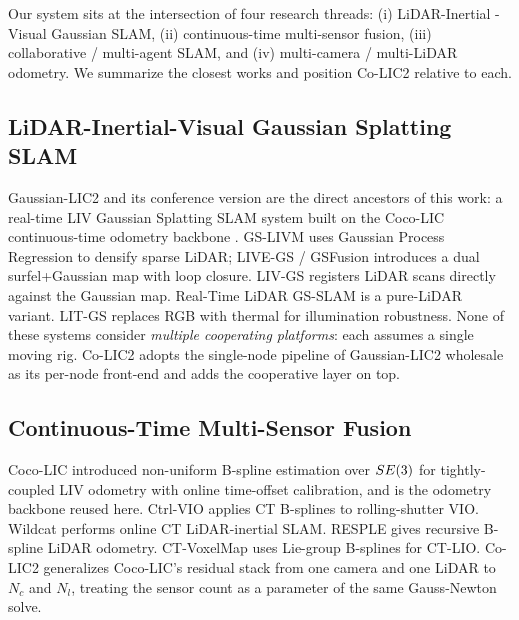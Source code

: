 Our system sits at the intersection of four research threads: (i) LiDAR-Inertial
-Visual Gaussian SLAM, (ii) continuous-time multi-sensor fusion, (iii)
collaborative / multi-agent SLAM, and (iv) multi-camera / multi-LiDAR
odometry. We summarize the closest works and position Co-LIC2 relative to each.

\subsection{LiDAR-Inertial-Visual Gaussian Splatting SLAM}
Gaussian-LIC2 \cite{lang2026gaussian2} and its conference version
\cite{lang2025gaussian} are the direct ancestors of this work: a real-time
LIV Gaussian Splatting SLAM system built on the Coco-LIC continuous-time
odometry backbone \cite{lang2023coco}. GS-LIVM \cite{xie2025gslivm} uses
Gaussian Process Regression to densify sparse LiDAR; LIVE-GS / GSFusion
\cite{park2026livegs} introduces a dual surfel+Gaussian map with loop closure.
LIV-GS \cite{xiao2025livgs} registers LiDAR scans directly against the Gaussian
map. Real-Time LiDAR GS-SLAM \cite{tak2026realtime} is a pure-LiDAR
variant. LIT-GS \cite{shi2026litgs} replaces RGB with thermal for illumination
robustness. None of these systems consider \emph{multiple cooperating
platforms}: each assumes a single moving rig. Co-LIC2 adopts the single-node
pipeline of Gaussian-LIC2 wholesale as its per-node front-end and adds the
cooperative layer on top.

\subsection{Continuous-Time Multi-Sensor Fusion}
Coco-LIC \cite{lang2023coco} introduced non-uniform B-spline estimation over
$SE(3)$ for tightly-coupled LIV odometry with online time-offset
calibration, and is the odometry backbone reused here. Ctrl-VIO
\cite{lang2022ctrlvio} applies CT B-splines to rolling-shutter VIO. Wildcat
\cite{ramezani2022wildcat} performs online CT LiDAR-inertial SLAM. RESPLE
\cite{cao2025resple} gives recursive B-spline LiDAR odometry. CT-VoxelMap
\cite{zhao2026ctvoxelmap} uses Lie-group B-splines for CT-LIO. Co-LIC2
generalizes Coco-LIC's residual stack from one camera and one LiDAR to $N_c$
and $N_l$, treating the sensor count as a parameter of the same Gauss-Newton
solve.

